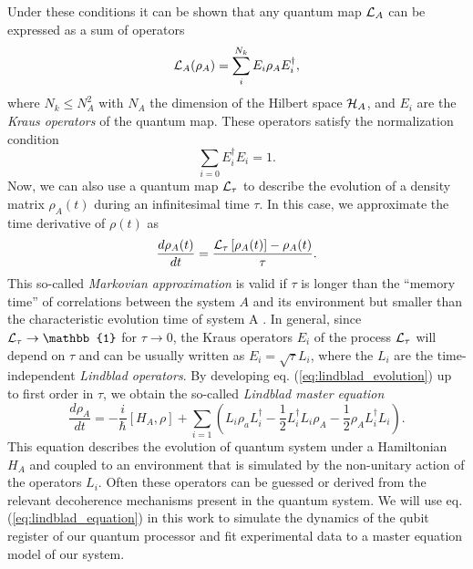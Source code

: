 Under these conditions it can be shown that any quantum map $\LA{A}$ can be expressed as a sum of operators \citep{kraus_states_1983}
%
\begin{equation}
\LA{A}(\rho_A) = \sum\limits_i^{N_k} E_i \rho_A E_i^\dagger, \label{eq:kraus_representation}
\end{equation}
%
where $N_k \le N_A^2$ with $N_A$ the dimension of the Hilbert space $\begin{mathcal}H\end{mathcal}_A$, and $E_i$ are the {\it Kraus operators} of the quantum map. These operators satisfy the normalization condition
%
\begin{equation}
\sum\limits_{i=0} E_i^\dagger E_i = \mathrm{1}.
\end{equation}
%
Now, we can also use a quantum map $\LA{\tau}$ to describe the evolution of a density matrix $\rho_A(t)$ during an infinitesimal time $\tau$. In this case, we approximate the time derivative of $\rho(t)$ as
%
\begin{equation}
\frac{d\rho_A(t)}{dt}=\frac{\LA{\tau}\left[\rho_A(t)\right]-\rho_A(t)}{\tau}. \label{eq:lindblad_evolution}
\end{equation}
%
This so-called {\it Markovian approximation} is valid if $\tau$ is longer than the ``memory time'' of correlations between the system $A$ and its environment but smaller than the characteristic evolution time of system A \citep{haroche_exploring_2006}. In general, since $\LA{\tau}\to \mathbb{1}$ for $\tau\to 0$, the Kraus operators $E_i$ of the process $\LA{\tau}$ will depend on $\tau$ and can be usually written as $E_i = \sqrt{\tau} L_i$, where the $L_i$ are the time-independent {\it Lindblad operators}. By developing eq. (\ref{eq:lindblad_evolution}) up to first order in $\tau$, we obtain the so-called {\it Lindblad master equation}
%
\begin{equation}
\frac{d\rho_A}{dt} = -\frac{i}{\hbar}[H_A,\rho]+\sum\limits_{i = 1}\left(L_i\rho_aL_i^\dagger-\frac{1}{2}L_i^\dagger L_i\rho_A-\frac{1}{2}\rho_A L_i^\dagger L_i\right). \label{eq:lindblad_equation}
\end{equation}
%
This equation describes the evolution of quantum system under a Hamiltonian $H_A$ and coupled to an environment that is simulated by the non-unitary action of the operators $L_i$. Often these operators can be guessed or derived from the relevant decoherence mechanisms present in the quantum system. We will use eq. (\ref{eq:lindblad_equation}) in this work to simulate the dynamics of the qubit register of our quantum processor and fit experimental data to a master equation model of our system.


